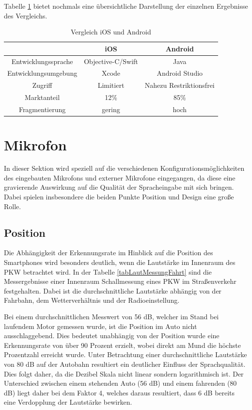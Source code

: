 Tabelle \ref{tabAndroidVsIOS} bietet nochmals eine übersichtliche Darstellung der einzelnen Ergebnisse des Vergleichs.
\begin{table}[h]
\centering
\begin{tabular}{ |c|c|c| } 
 \hline
 & iOS & Android \\
 \hline
 Entwicklungssprache & Objective-C/Swift & Java \\
 Entwicklungsumgebung & Xcode & Android Studio  \\
 Zugriff & Limitiert & Nahezu Restriktionsfrei   \\
 Marktanteil &12\% & 85\%\\
 Fragmentierung & gering & hoch\\
 \hline
\end{tabular}
\caption{Vergleich iOS und Android}
\label{tabAndroidVsIOS}
\end{table}


\section{Mikrofon}
\label{chpt:Mic}
In dieser Sektion wird speziell auf die verschiedenen Konfigurationsmöglichkeiten des eingebauten Mikrofons und externer Mikrofone eingegangen, da diese eine gravierende Auswirkung auf die Qualität der Spracheingabe mit sich bringen. Dabei spielen insbesondere die beiden Punkte Position und Design eine große Rolle.

\subsection{Position}
Die Abhängigkeit der Erkennungsrate im Hinblick auf die Position des Smartphones wird besonders deutlich, wenn die Lautstärke im Innenraum des PKW betrachtet wird.
In der Tabelle \ref{tabLautMessungFahrt} sind die Messergebnisse einer Innenraum Schallmessung eines PKW im Straßenverkehr festgehalten.%
Dabei ist die durchschnittliche Lautstärke abhängig von der Fahrbahn, dem Wetterverhältnis und der Radioeinstellung. 

Bei einem durchschnittlichen Messwert von 56 dB, welcher im Stand bei laufendem Motor gemessen wurde, ist die Position im Auto nicht ausschlaggebend. Dies bedeutet unabhängig von der Position wurde eine Erkennungsrate von über 90 Prozent erzielt, wobei direkt am Mund die höchste Prozentzahl erreicht wurde. Unter Betrachtung einer durchschnittliche Lautstärke von 80 dB auf der Autobahn resultiert ein deutlicher Einfluss der Sprachqualität. Dies folgt daher, da die Dezibel Skala nicht linear sondern logarithmisch ist. Der Unterschied zwischen einem stehenden Auto (56 dB) und einem fahrenden (80 dB) liegt daher bei dem Faktor 4, welches daraus resultiert, dass 6 dB bereits eine Verdopplung der Lautstärke bewirken. 

